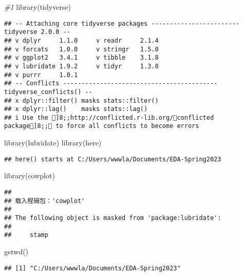 \documentclass[
]{article}
\newenvironment{Shaded}{\begin{snugshade}}{\end{snugshade}}
\newcommand{\CommentTok}[1]{\textcolor[rgb]{0.56,0.35,0.01}{\textit{#1}}}
\newcommand{\FunctionTok}[1]{\textcolor[rgb]{0.00,0.00,0.00}{#1}}
\newcommand{\NormalTok}[1]{#1}
\begin{document}
\begin{Shaded}
\begin{Highlighting}[]
\CommentTok{\#1 }
\FunctionTok{library}\NormalTok{(tidyverse)}
\end{Highlighting}
\end{Shaded}

\begin{verbatim}
## -- Attaching core tidyverse packages ------------------------ tidyverse 2.0.0 --
## v dplyr     1.1.0     v readr     2.1.4
## v forcats   1.0.0     v stringr   1.5.0
## v ggplot2   3.4.1     v tibble    3.1.8
## v lubridate 1.9.2     v tidyr     1.3.0
## v purrr     1.0.1     
## -- Conflicts ------------------------------------------ tidyverse_conflicts() --
## x dplyr::filter() masks stats::filter()
## x dplyr::lag()    masks stats::lag()
## i Use the ]8;;http://conflicted.r-lib.org/conflicted package]8;; to force all conflicts to become errors
\end{verbatim}

\begin{Shaded}
\begin{Highlighting}[]
\FunctionTok{library}\NormalTok{(lubridate)}
\FunctionTok{library}\NormalTok{(here)}
\end{Highlighting}
\end{Shaded}

\begin{verbatim}
## here() starts at C:/Users/wwwla/Documents/EDA-Spring2023
\end{verbatim}

\begin{Shaded}
\begin{Highlighting}[]
\FunctionTok{library}\NormalTok{(cowplot)}
\end{Highlighting}
\end{Shaded}

\begin{verbatim}
## 
## 载入程辑包：'cowplot'
## 
## The following object is masked from 'package:lubridate':
## 
##     stamp
\end{verbatim}

\begin{Shaded}
\begin{Highlighting}[]
\FunctionTok{getwd}\NormalTok{()}
\end{Highlighting}
\end{Shaded}

\begin{verbatim}
## [1] "C:/Users/wwwla/Documents/EDA-Spring2023"
\end{verbatim}
\end{document}
